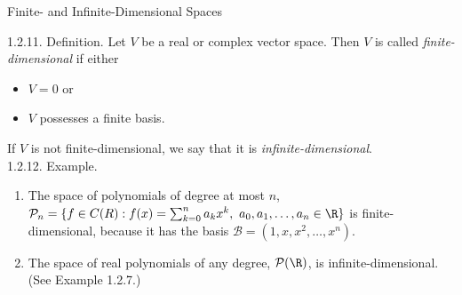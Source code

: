\documentclass[smaller,hyperref={CJKbookmarks=true}]{beamer}
\begin{document}
\begin{frame}[t]{Finite- and Infinite-Dimensional Spaces}
\begin{spacing}{1.1}
\alert{1.2.11. Definition.} Let $V$ be a real or complex vector space. Then $V$ is called \emph{finite-dimensional} if either
\begin{itemize}
  \item $V={0}$ or
  \item $V$ possesses a finite basis.
\end{itemize}
If $V$ is not finite-dimensional, we say that it is \emph{infinite-dimensional}.\\[11pt]
\alert{1.2.12. Example.}
\begin{enumerate}[1.]
  \item The space of polynomials of degree at most $n$, $\mathcal{P}_n=\{f\in C(R): f(x)=\sum_{k=0}^{n}a_kx^k,~a_0,a_1,\ldots,a_n\in\R\}$ is finite-dimensional, because it has the basis $\mathcal{B}=(1,x,x^2,\ldots,x^n).$
  \item The space of real polynomials of any degree, $\mathcal{P}(\R)$, is infinite-dimensional. (See Example 1.2.7.)
\end{enumerate}
\end{spacing}
\end{frame}
\end{document}
